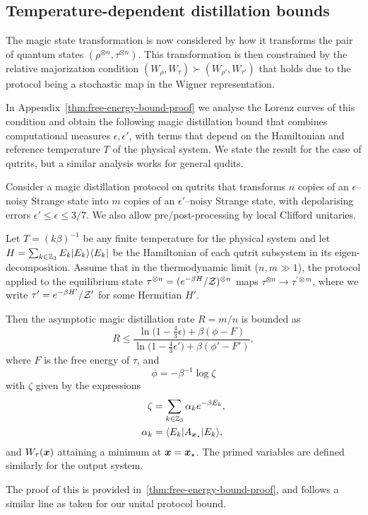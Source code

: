 \documentclass[pra,
aps,
twocolumn,
superscriptaddress,
groupedaddress,
nofootinbib,
reprint
]{revtex4-1}
\begin{document}
\subsection{Temperature-dependent distillation bounds}

The magic state transformation is now considered by how it transforms the pair of quantum states $(\rho^{\otimes n}, \tau^{\otimes n})$. This transformation is then constrained by the relative majorization condition $(W_{\rho}, W_\tau) \succ (W_{\rho'}, W_{\tau'})$ that holds due to the protocol being a stochastic map in the Wigner representation.

In Appendix~\ref{thm:free-energy-bound-proof} we analyse the Lorenz curves of this condition and obtain the following magic distillation bound that combines computational measures $\epsilon,\epsilon'$, with terms that depend on the Hamiltonian and reference temperature $T$ of the physical system. We state the result for the case of qutrits, but a similar analysis works for general qudits.

\begin{theorem}\label{thm:free-energy}
	Consider a magic distillation protocol on qutrits that transforms $n$ copies of an $\epsilon$--noisy Strange state into $m$ copies of an $\epsilon'$--noisy Strange state, with depolarising errors $\epsilon' \leq \epsilon \leq 3/7$. We also allow pre/post-processing by local Clifford unitaries.
	
	Let $T =(k\beta)^{-1}$ be any finite temperature for the physical system and let $H= \sum_{k \in \mathbb{Z}_3} E_k |E_k\rangle\langle E_k|$ be the Hamiltonian of each qutrit subsystem in its eigen-decomposition.
Assume that in the thermodynamic limit ($n,m \gg 1$), the protocol applied to the equilibrium state $\tau^{\otimes n} = (e^{-\beta H}/\mathcal{Z})^{\otimes n}$ maps $\tau^{\otimes n} \longrightarrow \tau^{\prime \otimes m}$, where we write $\tau' = e^{-\beta H'}/\mathcal{Z}'$ for some Hermitian $H'$.

Then the asymptotic magic distillation rate $R = m/n$ is bounded as
\begin{equation}\label{eq:rate_bounds_proof}
	R \leq \dfrac{\ln \big( 1-\frac{4}{3}\epsilon \big) + \beta (\phi - F)}{\ln \big( 1-\frac{4}{3}\epsilon' \big) + \beta (\phi' - F')},
\end{equation}
where $F$ is the free energy of $\tau$,  and 
\begin{equation}
	\phi = -\beta^{-1} \log \zeta
\end{equation}
with $\zeta$ given by the expressions
\begin{align}
	\zeta &= \sum_{k\in \mathbb{Z}_3} \alpha_k e^{-\beta E_k}, \nonumber\\
	\alpha_k &= \langle E_k| A_{\boldsymbol{x}_\star} |E_k\rangle,
\end{align}
and $W_\tau(\boldsymbol{x})$ attaining a minimum at $\boldsymbol{x}=\boldsymbol{x}_\star$. The primed variables are defined similarly for the output system.
\end{theorem}
\noindent The proof of this is provided in~\cref{thm:free-energy-bound-proof}, and follows a similar line as taken for our unital protocol bound.
\end{document}
